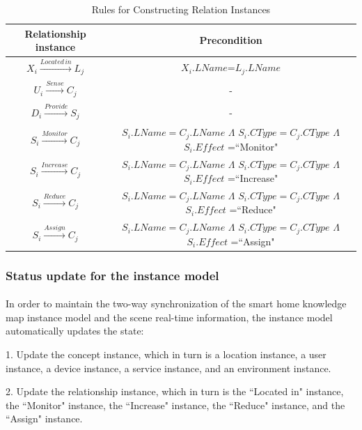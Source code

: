 \begin{table}[htbp]
	\caption{Rules for Constructing Relation Instances}
	\centering  %
	\label{table5}  %
	\renewcommand\arraystretch{1.5}  %
	\begin{tabular}{|c|c|}  %
		\hline
		Relationship instance & Precondition \\
		\hline
		$X_{i}\xrightarrow[]{Located\,in}L_{j}$ & $X_{i}.LName$=$L_{j}.LName$ \\
		\hline		
		$U_{i}\xrightarrow[]{Sense} C_{j}$      & - \\
		\hline		
		$D_{i}\xrightarrow[]{Provide}S_{j}$     & - \\
		\hline		
		$S_{i}\xrightarrow[]{Monitor}C_{j}$     & $S_{i}.LName=C_{j}.LName$ $\Lambda$ $S_{i}.CType=C_{j}.CType$ $\Lambda$ $S_{i}.Effect$ =``Monitor"\\
		\hline		
		$S_{i}\xrightarrow[]{Increase}C_{j}$    & $S_{i}.LName=C_{j}.LName$ $\Lambda$ $S_{i}.CType=C_{j}.CType$ $\Lambda$ $S_{i}.Effect$ =``Increase"\\
		\hline	
		$S_{i}\xrightarrow[]{Reduce}C_{j}$      & $S_{i}.LName=C_{j}.LName$ $\Lambda$ $S_{i}.CType=C_{j}.CType$ $\Lambda$ $S_{i}.Effect$ =``Reduce"\\
		\hline
		$S_{i}\xrightarrow[]{Assign}C_{j}$      & $S_{i}.LName=C_{j}.LName$ $\Lambda$ $S_{i}.CType=C_{j}.CType$ $\Lambda$ $S_{i}.Effect$ =``Assign"\\
		\hline
	\end{tabular}
\end{table}

\subsubsection{Status update for the instance model}
\paragraph{}
In order to maintain the two-way synchronization of the smart home knowledge map instance model and the scene real-time information, the instance model automatically updates the state:

1. Update the concept instance, which in turn is a location instance, a user instance, a device instance, a service instance, and an environment instance.

2. Update the relationship instance, which in turn is the ``Located in" instance, the ``Monitor" instance, the ``Increase" instance, the ``Reduce" instance, and the ``Assign" instance.

